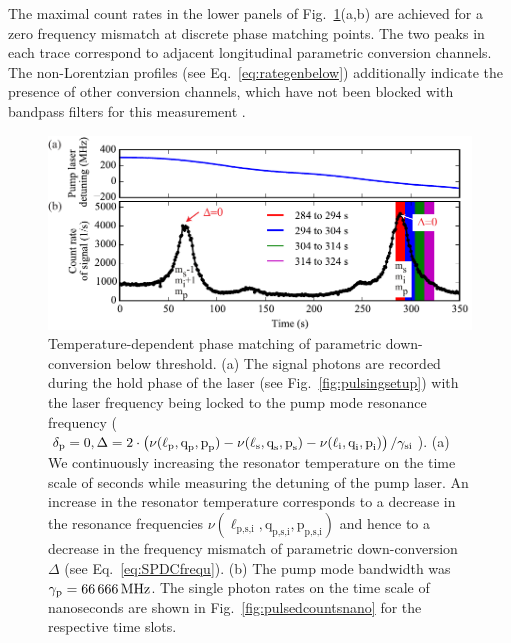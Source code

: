 \documentclass[aps,pra,showpacs,reprint,onecolumn,notitlepage]{revtex4-1}
\newcommand{\tx}[1]{\textnormal{#1}}
\begin{document}
The maximal count rates in the lower panels of Fig.~\ref{fig:pulsedcounts}(a,b) are achieved for a zero frequency mismatch at discrete phase matching points. The two peaks in each trace correspond to adjacent longitudinal parametric conversion channels. The non-Lorentzian profiles (see Eq.~\ref{eq:rategenbelow}) additionally indicate the presence of other conversion channels, which have not been blocked with bandpass filters for this measurement \cite{Michael2014}.

\begin{figure}[htb]
  \centering
  \includegraphics[scale=0.8]{pictures/exp_WGMR_detuning/SPDC_detuning_tempshift_1.pdf} 
\caption{Temperature-dependent phase matching of parametric down-conversion below threshold. (a) The signal photons are recorded during the hold phase of the laser (see Fig.~\ref{fig:pulsingsetup}) with the laser frequency being locked to the pump mode resonance frequency ($\delta_\tx{p} = 0, \Delta =2 \cdot \left( \nu (\ell_\textrm{p},\textrm{q}_\textrm{p},\textrm{p}_\textrm{p}) - \nu (\ell_\textrm{s},\textrm{q}_\textrm{s},\textrm{p}_\textrm{s}) - \nu (\ell_\textrm{i},\textrm{q}_\textrm{i},\textrm{p}_\textrm{i})\right) / \gamma_\tx{si} $). (a) We continuously increasing the resonator temperature on the time scale of seconds while measuring the detuning of the pump laser. An increase in the resonator temperature corresponds to a decrease in the resonance frequencies $\nu (\ell_\textrm{p,s,i},\textrm{q}_\textrm{p,s,i},\textrm{p}_\textrm{p,s,i})$ and hence to a decrease in the frequency mismatch of parametric down-conversion $\Delta$ (see  Eq.~\ref{eq:SPDCfrequ}). (b) The pump mode bandwidth was $\gamma_\tx{p}=\SI{66666}{\MHz}$. The single photon rates on the time scale of nanoseconds are shown in Fig.~\ref{fig:pulsedcountsnano} for the respective time slots.}
	\label{fig:pulsedcounts}
\end{figure}
\end{document}
